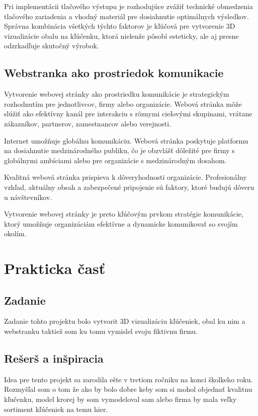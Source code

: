       Pri implementácii tlačového výstupu je rozhodujúce zvážiť technické obmedzenia tlačového zariadenia a vhodný materiál pre dosiahnutie optimálnych výsledkov. Správna kombinácia všetkých týchto faktorov je kľúčová pre vytvorenie 3D vizualizácie obalu na kľúčenku, ktorá nielenže pôsobí esteticky, ale aj presne odzrkadľuje skutočný výrobok.

    \subsection{Webstranka ako prostriedok komunikacie}
      Vytvorenie webovej stránky ako prostriedku komunikácie je strategickým rozhodnutím pre jednotlivcov, firmy alebo organizácie. Webová stránka môže slúžiť ako efektívny kanál pre interakciu s rôznymi cieľovými skupinami, vrátane zákazníkov, partnerov, zamestnancov alebo verejnosti. 

      Internet umožňuje globálnu komunikáciu. Webová stránka poskytuje platformu na dosiahnutie medzinárodného publiku, čo je obzvlášť dôležité pre firmy s globálnymi ambíciami alebo pre organizácie s medzinárodným dosahom.
    
      Kvalitná webová stránka prispieva k dôveryhodnosti organizácie. Profesionálny vzhľad, aktuálny obsah a zabezpečené pripojenie sú faktory, ktoré budujú dôveru u návštevníkov.


      Vytvorenie webovej stránky je preto kľúčovým prvkom stratégie komunikácie, ktorý umožňuje organizáciám efektívne a dynamicke komunikovať so svojím okolím.

  \newpage

  \section{Prakticka časť}
    \subsection{Zadanie}
      Zadanie tohto projektu bolo vytvorit 3D vizualizáciu kľúčeniek, obal ku nim a webstranku taktiež som ku tomu vymislel svoju fiktivnu firmu.

    \subsection{Rešerš a inšpiracia}
      Idea pre tento projekt sa zarodila ešte v tretiom ročniku na konci školkeho roku. Rozmyšľal som o tom že ako by bolo dobre keby som si mohol objednať kvalitnu kľučenku, model krorej by som vymodeloval sam alebo firma by mala veľky sortiment kľúčeniek na temu hier. 

